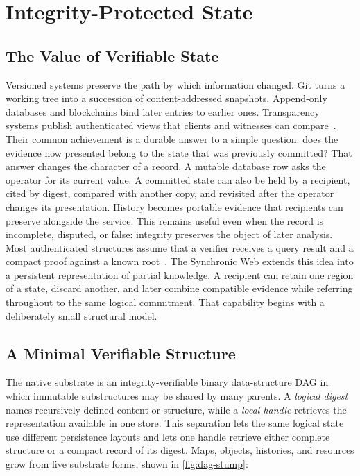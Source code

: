 \section{Integrity-Protected State}
\label{sec:integrity-state}
\label{sec:substrate}
\label{sec:partial-knowledge}

\subsection{The Value of Verifiable State}

Versioned systems preserve the path by which information changed. Git turns a working tree into a succession of content-addressed snapshots. Append-only databases and blockchains bind later entries to earlier ones. Transparency systems publish authenticated views that clients and witnesses can compare~\cite{Haber1991timestamp,Laurie2014certificate,Melara2015coniks}. Their common achievement is a durable answer to a simple question: does the evidence now presented belong to the state that was previously committed? That answer changes the character of a record. A mutable database row asks the operator for its current value. A committed state can also be held by a recipient, cited by digest, compared with another copy, and revisited after the operator changes its presentation. History becomes portable evidence that recipients can preserve alongside the service. This remains useful even when the record is incomplete, disputed, or false: integrity preserves the object of later analysis. Most authenticated structures assume that a verifier receives a query result and a compact proof against a known root~\cite{Martel2004general,Miller2014authenticated}. The Synchronic Web extends this idea into a persistent representation of partial knowledge. A recipient can retain one region of a state, discard another, and later combine compatible evidence while referring throughout to the same logical commitment. That capability begins with a deliberately small structural model.

\subsection{A Minimal Verifiable Structure}

The native substrate is an integrity-verifiable binary data-structure DAG in which immutable substructures may be shared by many parents. A \emph{logical digest} names recursively defined content or structure, while a \emph{local handle} retrieves the representation available in one store. This separation lets the same logical state use different persistence layouts and lets one handle retrieve either complete structure or a compact record of its digest. Maps, objects, histories, and resources grow from five substrate forms, shown in \cref{fig:dag-stump}:

